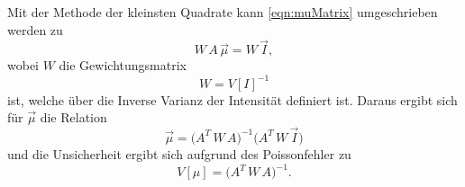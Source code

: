 Mit der Methode der kleinsten Quadrate kann \autoref{eqn:muMatrix} umgeschrieben werden zu
\begin{equation}
    W \,A \,\vec{\mu} = W \,\vec{I},
\end{equation}
wobei $W$ die Gewichtungsmatrix
\begin{equation}
    W = V[I]^{-1}
\end{equation}
ist, welche über die Inverse Varianz der Intensität definiert ist. Daraus ergibt sich für $\vec{\mu}$ die Relation
\begin{equation}
    \vec{\mu} = \biggl(A^T\, W \,A\biggr)^{-1} \biggl(A^T \,W \,\vec{I}\biggr)
    \label{eqn:mu_gleichung}
\end{equation}
und die Unsicherheit ergibt sich aufgrund des Poissonfehler zu
\begin{equation}
    V[\mu] = \biggl(A^T\, W \,A\biggr)^{-1}.
    \label{eqn:Unsicherheit}
\end{equation}



